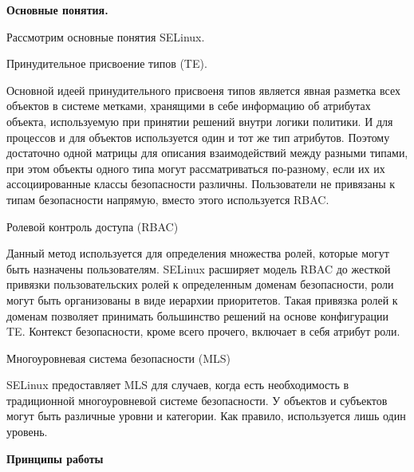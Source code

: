\bigskip
{\bfseries Основные понятия. }

Рассмотрим основные понятия SELinux. 

Принудительное присвоение типов (TE). 

Основной идеей принудительного присвоеня
типов является явная разметка всех объектов 
в системе метками, хранящими в себе информацию
об атрибутах объекта, используемую при принятии 
решений внутри логики политики. 
И для процессов и для объектов используется 
один и тот же тип атрибутов. Поэтому достаточно 
одной матрицы для описания взаимодействий между 
разными типами, при этом объекты одного типа могут 
рассматриваться по-разному, если их их ассоциированные 
классы безопасности различны. Пользователи не 
привязаны к типам безопасности напрямую, вместо 
этого используется RBAC.

\bigskip
Ролевой контроль доступа (RBAC) 

Данный метод используется для определения 
множества ролей, которые могут 
быть назначены пользователям. SELinux расширяет 
модель RBAC до жесткой привязки пользовательских 
ролей к определенным доменам безопасности, роли 
могут быть организованы в виде иерархии приоритетов. 
Такая привязка ролей к доменам позволяет принимать 
большинство решений на основе конфигурации TE. 
Контекст безопасности, кроме всего прочего, включает 
в себя атрибут роли.

\bigskip
Многоуровневая система безопасности (MLS) 

SELinux предоставляет MLS для случаев, когда есть 
необходимость в традиционной многоуровневой системе 
безопасности. У объектов и субъектов могут быть 
различные уровни и категории. 
Как правило, используется лишь один уровень. 

\bigskip
{\bfseries Принципы работы}

